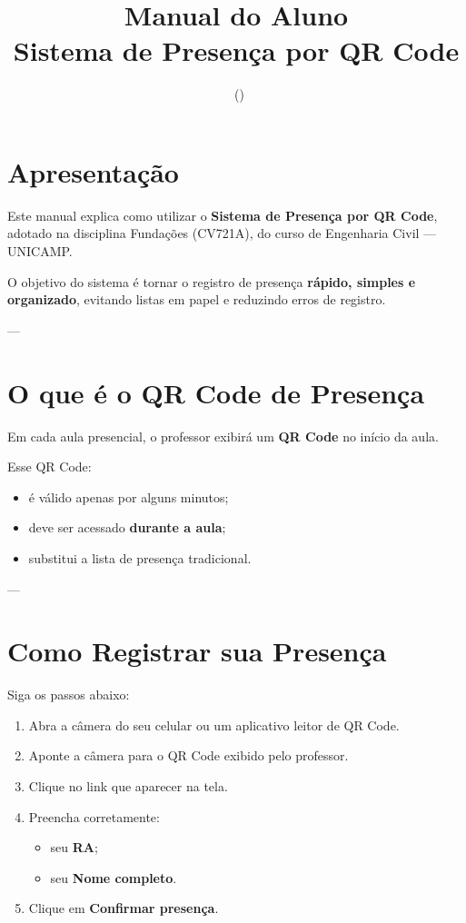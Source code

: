 \documentclass[12pt,a4paper]{article}
\title{\textbf{Manual do Aluno}\\
Sistema de Presença por QR Code\\
\Disciplina}
\author{}
\date{\DataManual\ (\VersaoManual)}
\newcommand{\Disciplina}{Fundações (CV721A)}
\newcommand{\Curso}{Engenharia Civil — UNICAMP}
\begin{document}
\maketitle

\section{Apresentação}

Este manual explica como utilizar o \textbf{Sistema de Presença por QR Code}, adotado na disciplina \Disciplina{}, do curso de \Curso{}.

O objetivo do sistema é tornar o registro de presença \textbf{rápido, simples e organizado}, evitando listas em papel e reduzindo erros de registro.

---

\section{O que é o QR Code de Presença}

Em cada aula presencial, o professor exibirá um \textbf{QR Code} no início da aula.

Esse QR Code:
\begin{itemize}[noitemsep]
  \item é válido apenas por alguns minutos;
  \item deve ser acessado \textbf{durante a aula};
  \item substitui a lista de presença tradicional.
\end{itemize}

---

\section{Como Registrar sua Presença}

Siga os passos abaixo:

\begin{enumerate}[label=\arabic*)]
  \item Abra a câmera do seu celular ou um aplicativo leitor de QR Code.
  \item Aponte a câmera para o QR Code exibido pelo professor.
  \item Clique no link que aparecer na tela.
  \item Preencha corretamente:
  \begin{itemize}[noitemsep]
    \item seu \textbf{RA};
    \item seu \textbf{Nome completo}.
  \end{itemize}
  \item Clique em \textbf{Confirmar presença}.
\end{enumerate}
\end{document}
